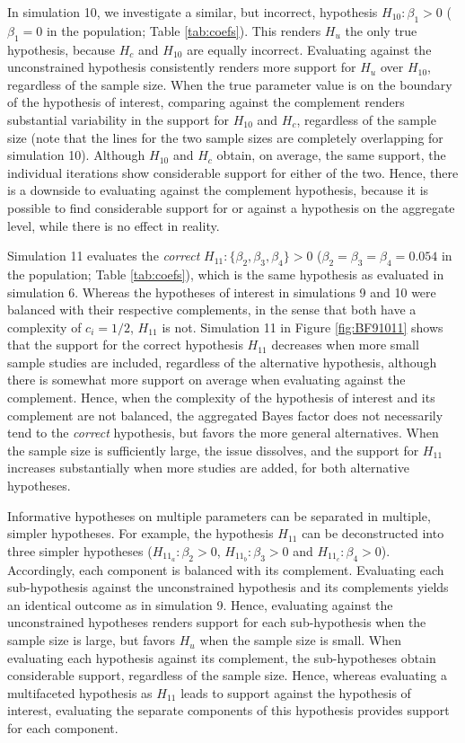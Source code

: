 \documentclass[review, 3p, authoryear]{elsarticle} %
\begin{document}
In simulation 10, we investigate a similar, but incorrect, hypothesis \(H_{10}: \beta_1 > 0\) (\(\beta_{1}=0\) in the population; Table \ref{tab:coefs}).
This renders \(H_u\) the only true hypothesis, because \(H_c\) and \(H_{10}\) are equally incorrect.
Evaluating against the unconstrained hypothesis consistently renders more support for \(H_u\) over \(H_{10}\), regardless of the sample size.
When the true parameter value is on the boundary of the hypothesis of interest, comparing against the complement renders substantial variability in the support for \(H_{10}\) and \(H_c\), regardless of the sample size (note that the lines for the two sample sizes are completely overlapping for simulation 10).
Although \(H_{10}\) and \(H_c\) obtain, on average, the same support, the individual iterations show considerable support for either of the two.
Hence, there is a downside to evaluating against the complement hypothesis, because it is possible to find considerable support for or against a hypothesis on the aggregate level, while there is no effect in reality.

Simulation 11 evaluates the \emph{correct} \(H_{11}: \{\beta_2, \beta_3, \beta_4\} > 0\) (\(\beta_2 = \beta_3 = \beta_4 = 0.054\) in the population; Table \ref{tab:coefs}), which is the same hypothesis as evaluated in simulation 6.
Whereas the hypotheses of interest in simulations 9 and 10 were balanced with their respective complements, in the sense that both have a complexity of \(c_i = 1/2\), \(H_{11}\) is not.
Simulation 11 in Figure \ref{fig:BF91011} shows that the support for the correct hypothesis \(H_{11}\) decreases when more small sample studies are included, regardless of the alternative hypothesis, although there is somewhat more support on average when evaluating against the complement.
Hence, when the complexity of the hypothesis of interest and its complement are not balanced, the aggregated Bayes factor does not necessarily tend to the \emph{correct} hypothesis, but favors the more general alternatives.
When the sample size is sufficiently large, the issue dissolves, and the support for \(H_{11}\) increases substantially when more studies are added, for both alternative hypotheses.

Informative hypotheses on multiple parameters can be separated in multiple, simpler hypotheses.
For example, the hypothesis \(H_{11}\) can be deconstructed into three simpler hypotheses (\(H_{11_a}: \beta_2 > 0\), \(H_{11_b}: \beta_3 > 0\) and \(H_{11_c}: \beta_4 > 0\)).
Accordingly, each component is balanced with its complement.
Evaluating each sub-hypothesis against the unconstrained hypothesis and its complements yields an identical outcome as in simulation 9.
Hence, evaluating against the unconstrained hypotheses renders support for each sub-hypothesis when the sample size is large, but favors \(H_u\) when the sample size is small.
When evaluating each hypothesis against its complement, the sub-hypotheses obtain considerable support, regardless of the sample size.
Hence, whereas evaluating a multifaceted hypothesis as \(H_{11}\) leads to support against the hypothesis of interest, evaluating the separate components of this hypothesis provides support for each component.
\end{document}
